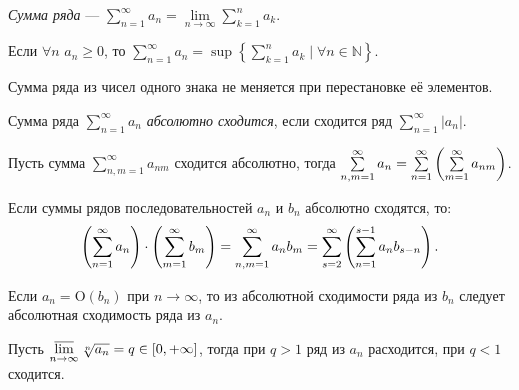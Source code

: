 
\begin{to_def}
	\textit{Сумма ряда} --- $\sum\limits_{n = 1}^{\infty} a_n = \lim\limits_{n \to \infty} \sum\limits_{k = 1}^{n} a_k$.
\end{to_def}

\begin{to_lem}
	Если $\forall n$ $a_n \geq 0$, то $\sum\limits_{  n = 1 }^{  \infty } a_n  = \sup\left\{ \sum\limits_{ k=1 }^{ n }   a_k \mid \forall n \in \mathbb{N}\right\}$.
	\label{4.17}
\end{to_lem}

\begin{to_con}
	 Сумма ряда из чисел одного знака не меняется при перестановке её элементов.
\end{to_con}

\begin{to_def}
	Сумма ряда $\sum\limits_{ n = 1 }^{ \infty } a_n $ \textit{абсолютно сходится}, если сходится ряд $\sum\limits_{ n = 1 }^{ \infty }|a_n|$.
\end{to_def}

\begin{to_lem}
	Пусть сумма $\sum\limits_{ n,m = 1 }^{ \infty } a_{n m}$ сходится абсолютно, тогда $\sum\limits_{ n,m = 1 }^{ \infty } a_n = \sum\limits_{ n=1 }^{ \infty } \left(\sum\limits_{ m = 1 }^{ \infty } a_{n m}\right)$.
	\label{4.21}
\end{to_lem}

\begin{to_thr}
	Если суммы рядов последовательностей $a_n$ и $b_n$ абсолютно сходятся, то:
	\begin{equation*}
	\begin{split}
		\left(\sum\limits_{ n = 1 }^{ \infty } a_n\right) \cdot \left(\sum\limits_{ m = 1 }^{ \infty } b_m\right) = 
		\sum\limits_{ n,m = 1 }^{ \infty } a_n b_m =
		\sum\limits_{ s = 2 }^{ \infty } \left(\sum\limits_{ n = 1 }^{ s - 1 } a_n b_{s-n}\right).
	\end{split}
	\end{equation*}
	\label{4.22}
\end{to_thr}

\begin{to_thr}
	Если  $a_n = \text{O}(b_n)$ при $n \to \infty$, то из абсолютной сходимости ряда из $b_n$ следует абсолютная сходимость ряда из $a_n$.
	\label{4.25}
\end{to_thr}

\begin{to_thr}
	Пусть $\varlimsup\limits_{n \to \infty} \sqrt[n]{a_n} = q \in [0, +\infty]$, тогда при $q > 1$ ряд из $a_n$ расходится, при $q < 1$ сходится.
\end{to_thr}

